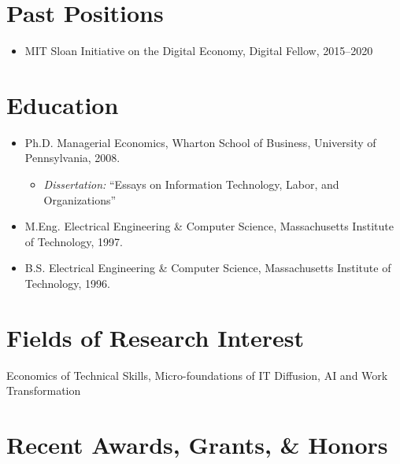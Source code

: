\documentclass[10pt,letterpaper]{article}
\begin{document}
\section*{Past Positions}
\begin{itemize}
\item MIT Sloan Initiative on the Digital Economy, Digital Fellow, 2015--2020
\end{itemize}

\section*{Education}

\begin{itemize}
  \item Ph.D. Managerial Economics, Wharton School of Business, University of Pennsylvania, 2008.
    \begin{itemize}
    \item \emph{Dissertation:} ``Essays on Information Technology, Labor, and Organizations''
    \end{itemize}
  \item M.Eng. Electrical Engineering \& Computer Science, Massachusetts Institute of Technology, 1997.
  \item B.S. Electrical Engineering \& Computer Science, Massachusetts Institute of Technology, 1996.
\end{itemize}

\section*{Fields of Research Interest}

Economics of Technical Skills, Micro-foundations of IT Diffusion, AI and Work Transformation

\section*{Recent Awards, Grants, \& Honors}
\end{document}
